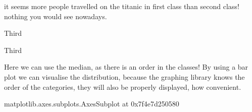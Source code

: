\documentclass[letterpaper,10pt,english]{jupyterBook}
\begin{document}
\sphinxAtStartPar
it seems more people travelled on the titanic in first class than second class! nothing you would see nowadays.

\begin{sphinxVerbatim}[commandchars=\\\{\}]
\PYG{p}{[}\PYG{p}{]}
\end{sphinxVerbatim}

\begin{sphinxVerbatim}[commandchars=\\\{\}]
\PYGZsq{}Third\PYGZsq{}
\end{sphinxVerbatim}

\begin{sphinxVerbatim}[commandchars=\\\{\}]
\PYG{p}{[}\PYG{p}{]}
\end{sphinxVerbatim}

\begin{sphinxVerbatim}[commandchars=\\\{\}]
\PYGZsq{}Third\PYGZsq{}
\end{sphinxVerbatim}

\sphinxAtStartPar
Here we can use the median, as there is an order in the classes! By using a bar plot we can visualise the distribution, because the graphing library knows the order of the categories, they will also be properly displayed, how convenient.

\begin{sphinxVerbatim}[commandchars=\\\{\}]
 
\end{sphinxVerbatim}

\begin{sphinxVerbatim}[commandchars=\\\{\}]
\PYGZlt{}matplotlib.axes.\PYGZus{}subplots.AxesSubplot at 0x7f4e7d250580\PYGZgt{}
\end{sphinxVerbatim}

\noindent{}
\end{document}

